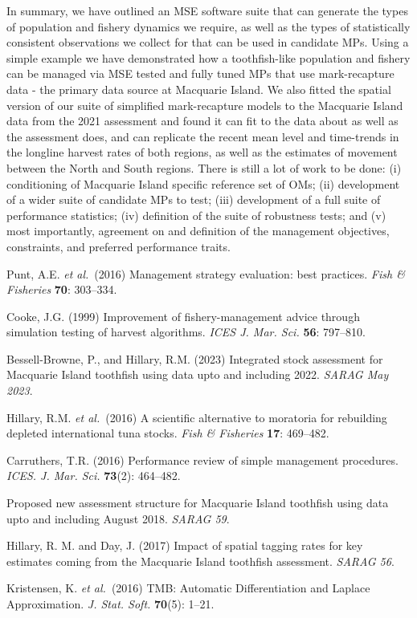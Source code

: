 \documentclass[12pt,a4paper,twoside,times,sky,standard]{csiroreport2017}
\newcommand{\etal}{\textit{et al.}}
\begin{document}
In summary, we have outlined an MSE software suite that can generate the types of population and fishery dynamics we require, as well as the types of statistically consistent observations we collect for that can be used in candidate MPs. Using a simple example we have demonstrated how a toothfish-like population and fishery can be managed via MSE tested and fully tuned MPs that use mark-recapture data - the primary data source at Macquarie Island. We also fitted the spatial version of our suite of simplified mark-recapture models to the Macquarie Island data from the 2021 assessment and found it can fit to the data about as well as the assessment does, and can replicate the recent mean level and time-trends in the longline harvest rates of both regions, as well as the estimates of movement between the North and South regions. There is still a lot of work to be done: (i) conditioning of Macquarie Island specific reference set of OMs; (ii) development of a wider suite of candidate MPs to test; (iii) development of a full suite of performance statistics; (iv) definition of the suite of robustness tests; and (v) most importantly, agreement on and definition of the management objectives, constraints, and preferred performance traits.

\clearpage
\begin{thebibliography}{99}

     Punt, A.E. \etal~(2016) Management strategy evaluation: best practices. \textit{Fish \& Fisheries} {\bf 70}: 303--334.

     Cooke, J.G. (1999) Improvement of fishery-management advice through simulation testing of harvest algorithms. \textit{ICES J. Mar. Sci.} {\bf 56}: 797--810.

     Bessell-Browne, P., and Hillary, R.M. (2023) Integrated stock assessment for Macquarie Island toothfish using data upto and including
        2022. \textit{SARAG May 2023}.

     Hillary, R.M. \etal~(2016) A scientiﬁc alternative to moratoria for rebuilding depleted international tuna stocks. \textit{Fish \& Fisheries} {\bf 17}: 469--482.

     Carruthers, T.R. (2016) Performance review of simple management procedures. \textit{ICES. J. Mar. Sci.} {\bf 73}(2): 464--482.

     Proposed new assessment structure for Macquarie Island toothfish using data upto and including August 2018. \textit{SARAG 59}.

     Hillary, R. M. and Day, J. (2017) Impact of spatial tagging rates for key estimates coming from the Macquarie Island toothfish assessment. \textit{SARAG 56}.

     Kristensen, K. \etal~(2016) TMB: Automatic Differentiation and Laplace Approximation. \textit{J. Stat. Soft.} {\bf 70}(5): 1--21.

\end{thebibliography}
\end{document}
